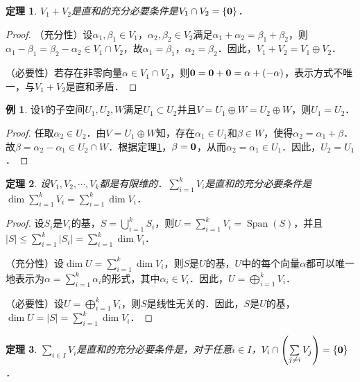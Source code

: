 \documentclass[a4paper,fontset=windows]{ctexbook}
\newtheorem{theorem}{定理}[chapter]
\theoremstyle{definition}
\newtheorem{example}{例}[chapter]
\DeclareMathOperator{\Span}{Span}
\renewcommand{\le}{\leqslant}
\begin{document}
\begin{theorem}\label{thm8.16}
$V_1+V_2$是直和的充分必要条件是$V_1\cap V_2=\{{\bf 0}\}$．
\end{theorem}

\begin{proof}
（充分性）设$\alpha_1,\beta_1\in V_1$，$\alpha_2,\beta_2\in V_2$满足$\alpha_1+\alpha_2=\beta_1+\beta_2$，则$\alpha_1-\beta_1=\beta_2-\alpha_2\in V_1\cap V_2$，故$\alpha_1=\beta_1$，$\alpha_2=\beta_2$．因此，$V_1+V_2=V_1\oplus V_2$．

（必要性）若存在非零向量$\alpha\in V_1\cap V_2$，则${\bf 0=0+0}=\alpha+(-\alpha)$，表示方式不唯一，与$V_1+V_2$是直和矛盾．
\end{proof}

\begin{example}
设$V$的子空间$U_1,U_2,W$满足$U_1\subset U_2$并且$V=U_1\oplus W=U_2\oplus W$，则$U_1=U_2$．
\end{example}

\begin{proof}
任取$\alpha_2\in U_2$．由$V=U_1\oplus W$知，存在$\alpha_1\in U_1$和$\beta\in W$，使得$\alpha_2=\alpha_1+\beta$．故$\beta=\alpha_2-\alpha_1\in U_2\cap W$．根据定理\ref{thm8.16}，$\beta={\bf 0}$，从而$\alpha_2=\alpha_1\in U_1$．因此，$U_2=U_1$．
\end{proof}

\begin{theorem}\label{thm8.17}
设$V_1,V_2,\cdots,V_k$都是有限维的．$\sum\limits_{i=1}^kV_i$是直和的充分必要条件是$\dim\sum\limits_{i=1}^kV_i=\sum\limits_{i=1}^k\dim V_i$．
\end{theorem}

\begin{proof}
设$S_i$是$V_i$的基，$S=\bigcup\limits_{i=1}^kS_i$，则$U=\sum\limits_{i=1}^kV_i=\Span(S)$，并且$|S|\le\sum\limits_{i=1}^k|S_i|=\sum\limits_{i=1}^k\dim V_i$．

（充分性）设$\dim U=\sum\limits_{i=1}^k\dim V_i$，则$S$是$U$的基，$U$中的每个向量$\alpha$都可以唯一地表示为$\alpha=\sum\limits_{i=1}^k\alpha_i$的形式，其中$\alpha_i\in V_i$．因此，$U=\bigoplus\limits_{i=1}^kV_i$．

（必要性）设$U=\bigoplus\limits_{i=1}^kV_i$，则$S$是线性无关的．因此，$S$是$U$的基，$\dim U=|S|=\sum\limits_{i=1}^k\dim V_i$．
\end{proof}

\begin{theorem}
$\sum\limits_{i\in I}V_i$是直和的充分必要条件是，对于任意$i\in I$，$V_i\cap\left(\sum\limits_{j\ne i}V_j\right)=\{{\bf 0}\}$．
\end{theorem}
\end{document}

